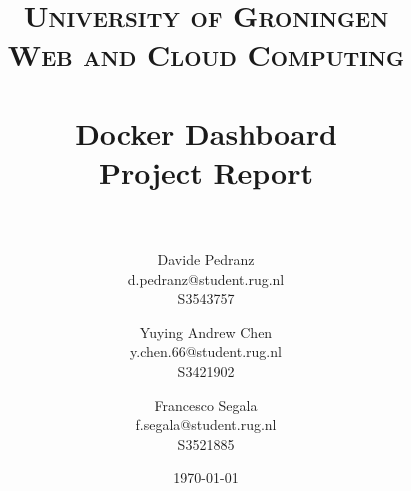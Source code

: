 \documentclass[paper=a4, fontsize=11pt]{scrartcl}
\title{
    \normalfont
    \large \textsc{University of Groningen \\ Web and Cloud Computing} \\ [22pt]
    \horrule{0.5pt} \\[0.4cm]
    \huge Docker Dashboard \\ Project Report \\
    \horrule{0.5pt} \\[0.5cm]
}
\author{%
	\begin{tabular}{c}
    	Davide Pedranz \\
        \small d.pedranz@student.rug.nl \\
        \small S3543757
    \end{tabular}
    \and
    \begin{tabular}{c}
    	Yuying Andrew Chen \\
        \small y.chen.66@student.rug.nl \\
        \small S3421902
    \end{tabular}
    \and
    \begin{tabular}{c} 
    	Francesco Segala \\ 
    	\small f.segala@student.rug.nl \\
        \small S3521885
    \end{tabular}
}
\date{\vspace{.5cm} \normalsize\today}
\numberwithin{equation}{section}		%
\numberwithin{figure}{section}			%
\numberwithin{table}{section}				%
\begin{document}
    \maketitle
    
    \tableofcontents
    \pagebreak

    
    
    
    
\end{document}
